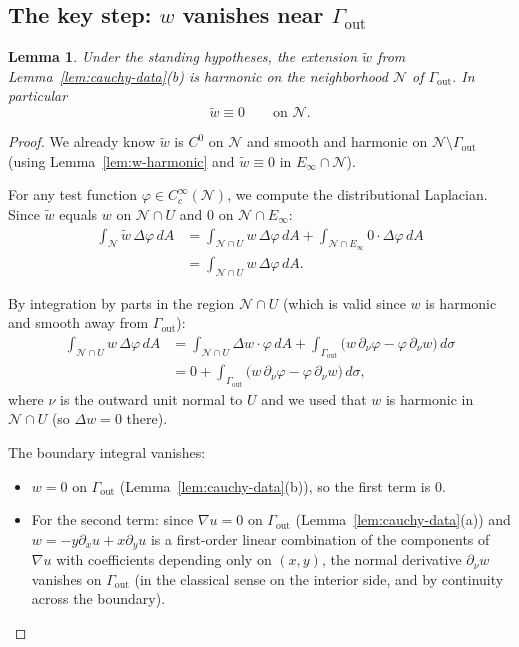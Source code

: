 \documentclass[11pt]{article}
\newtheorem{lemma}[theorem]{Lemma}
\newcommand{\1}{\mathbf 1}
\begin{document}
\subsection{The key step: $w$ vanishes near $\Gamma_{\mathrm{out}}$}

\begin{lemma}\label{lem:extension-harmonic}
Under the standing hypotheses, the extension $\tilde w$ from Lemma~\ref{lem:cauchy-data}(b)
is harmonic on the neighborhood $\mathcal N$ of $\Gamma_{\mathrm{out}}$. In particular
\[
\tilde w\equiv 0\qquad\text{on }\mathcal N.
\]
\end{lemma}

\begin{proof}
We already know $\tilde w$ is $C^0$ on $\mathcal N$ and smooth and harmonic on
$\mathcal N\setminus\Gamma_{\mathrm{out}}$ (using Lemma~\ref{lem:w-harmonic} and
$\tilde w\equiv 0$ in $E_\infty\cap\mathcal N$).

For any test function $\varphi\in C_c^\infty(\mathcal N)$, we compute the distributional Laplacian.
Since $\tilde w$ equals $w$ on $\mathcal N\cap U$ and $0$ on $\mathcal N\cap E_\infty$:
\begin{align*}
\int_{\mathcal N}\tilde w\,\Delta\varphi\,dA
&=\int_{\mathcal N\cap U}w\,\Delta\varphi\,dA+\int_{\mathcal N\cap E_\infty}0\cdot\Delta\varphi\,dA\\
&=\int_{\mathcal N\cap U}w\,\Delta\varphi\,dA.
\end{align*}

By integration by parts in the region $\mathcal N\cap U$ (which is valid since $w$ is harmonic
and smooth away from $\Gamma_{\mathrm{out}}$):
\begin{align*}
\int_{\mathcal N\cap U}w\,\Delta\varphi\,dA
&=\int_{\mathcal N\cap U}\Delta w\cdot\varphi\,dA
+\int_{\Gamma_{\mathrm{out}}}\!\bigl(w\,\partial_\nu\varphi-\varphi\,\partial_\nu w\bigr)\,d\sigma\\
&=0+\int_{\Gamma_{\mathrm{out}}}\!\bigl(w\,\partial_\nu\varphi-\varphi\,\partial_\nu w\bigr)\,d\sigma,
\end{align*}
where $\nu$ is the outward unit normal to $U$ and we used that $w$ is harmonic
in $\mathcal N\cap U$ (so $\Delta w=0$ there).

The boundary integral vanishes:
\begin{itemize}
\item $w=0$ on $\Gamma_{\mathrm{out}}$ (Lemma~\ref{lem:cauchy-data}(b)), so the first term is $0$.
\item For the second term: since $\nabla u=0$ on $\Gamma_{\mathrm{out}}$ (Lemma~\ref{lem:cauchy-data}(a))
and $w=-y\partial_x u+x\partial_y u$ is a first-order linear combination of the components
of $\nabla u$ with coefficients depending only on $(x,y)$, the normal derivative
$\partial_\nu w$ vanishes on $\Gamma_{\mathrm{out}}$ (in the classical sense on the interior side,
and by continuity across the boundary).
\end{itemize}


\end{proof}
\end{document}
